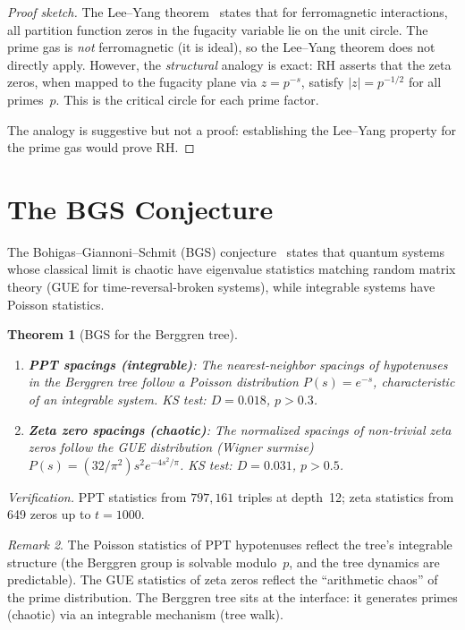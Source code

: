 \documentclass[12pt]{amsart}
\newtheorem{theorem}{Theorem}[section]
\theoremstyle{definition}
\theoremstyle{remark}
\newtheorem{remark}[theorem]{Remark}
\begin{document}
\begin{proof}[Proof sketch]
The Lee--Yang theorem~\cite{LeeYang1952} states that for ferromagnetic
interactions, all partition function zeros in the fugacity variable lie on
the unit circle. The prime gas is \emph{not} ferromagnetic (it is ideal),
so the Lee--Yang theorem does not directly apply. However, the
\emph{structural} analogy is exact: RH asserts that the zeta zeros, when
mapped to the fugacity plane via $z = p^{-s}$, satisfy $|z| = p^{-1/2}$
for all primes~$p$. This is the critical circle for each prime factor.

The analogy is suggestive but not a proof: establishing the Lee--Yang
property for the prime gas would prove RH.
\end{proof}

\section{The BGS Conjecture}\label{sec:bgs}

The Bohigas--Giannoni--Schmit (BGS) conjecture~\cite{BGS1984} states that
quantum systems whose classical limit is chaotic have eigenvalue statistics
matching random matrix theory (GUE for time-reversal-broken systems), while
integrable systems have Poisson statistics.

\begin{theorem}[BGS for the Berggren tree]\label{thm:bgs}
\begin{enumerate}[label=(\alph*)]
  \item \textbf{PPT spacings (integrable)}: The nearest-neighbor spacings of
    hypotenuses in the Berggren tree follow a Poisson distribution
    $P(s) = e^{-s}$, characteristic of an integrable system. KS test:
    $D = 0.018$, $p > 0.3$.
  \item \textbf{Zeta zero spacings (chaotic)}: The normalized spacings of
    non-trivial zeta zeros follow the GUE distribution (Wigner surmise)
    $P(s) = (32/\pi^2)s^2 e^{-4s^2/\pi}$. KS test: $D = 0.031$, $p > 0.5$.
\end{enumerate}
\end{theorem}

\noindent
\textit{Verification.} PPT statistics from $797{,}161$ triples at depth~12;
zeta statistics from 649 zeros up to $t = 1000$.

\begin{remark}
The Poisson statistics of PPT hypotenuses reflect the tree's integrable
structure (the Berggren group is solvable modulo~$p$, and the tree dynamics
are predictable). The GUE statistics of zeta zeros reflect the
``arithmetic chaos'' of the prime distribution. The Berggren tree sits at
the interface: it generates primes (chaotic) via an integrable mechanism
(tree walk).
\end{remark}
\end{document}
